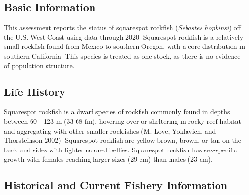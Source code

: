 \documentclass[11pt,
  english,
  a4paper,
]{article}
\begin{document}
\leavevmode\tagmcend\tagstructend


\hypertarget{basic-information}{%
\subsection{Basic Information}\label{basic-information}}

\leavevmode\tagmcend\tagstructend


This assessment reports the status of squarespot rockfish (\emph{Sebastes hopkinsi}) off the U.S. West Coast using data through 2020. Squarespot rockfish is a relatively small rockfish found from Mexico to southern Oregon, with a core distribution in southern California. This species is treated as one stock, as there is no evidence of population structure.

\leavevmode\tagmcend\tagstructend\par


\hypertarget{life-history}{%
\subsection{Life History}\label{life-history}}

\leavevmode\tagmcend\tagstructend


Squarespot rockfish is a dwarf species of rockfish commonly found in depths between 60 - 123 m (33-68 fm), hovering over or sheltering in rocky reef habitat and aggregating with other smaller rockfishes {(M. Love, Yoklavich, and Thorsteinson 2002)\leavevmode\tagmcend\tagstructend}. Squarespot rockfish are yellow-brown, brown, or tan on the back and sides with lighter colored bellies. Squarespot rockfish has sex-specific growth with females reaching larger sizes (29 cm) than males (23 cm).

\leavevmode\tagmcend\tagstructend\par


\hypertarget{historical-and-current-fishery-information}{%
\subsection{Historical and Current Fishery Information}\label{historical-and-current-fishery-information}}
\end{document}
